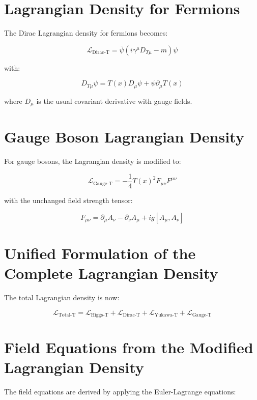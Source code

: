 \documentclass{article}
\begin{document}
	\section{Lagrangian Density for Fermions}
	The Dirac Lagrangian density for fermions becomes:
	
	\begin{equation}
		\mathcal{L}_{\text{Dirac-T}} = \bar{\psi} (i \gamma^\mu D_{T\mu} - m) \psi
	\end{equation}
	
	with:
	
	\begin{equation}
		D_{T\mu} \psi = T(x) D_\mu \psi + \psi \partial_\mu T(x)
	\end{equation}
	
	where \( D_\mu \) is the usual covariant derivative with gauge fields.
	
	\section{Gauge Boson Lagrangian Density}
	For gauge bosons, the Lagrangian density is modified to:
	
	\begin{equation}
		\mathcal{L}_{\text{Gauge-T}} = -\frac{1}{4} T(x)^2 F_{\mu\nu} F^{\mu\nu}
	\end{equation}
	
	with the unchanged field strength tensor:
	
	\begin{equation}
		F_{\mu\nu} = \partial_\mu A_\nu - \partial_\nu A_\mu + i g [A_\mu, A_\nu]
	\end{equation}
	
	\section{Unified Formulation of the Complete Lagrangian Density}
	The total Lagrangian density is now:
	
	\begin{equation}
		\mathcal{L}_{\text{Total-T}} = \mathcal{L}_{\text{Higgs-T}} + \mathcal{L}_{\text{Dirac-T}} + \mathcal{L}_{\text{Yukawa-T}} + \mathcal{L}_{\text{Gauge-T}}
	\end{equation}
	
	\section{Field Equations from the Modified Lagrangian Density}
	The field equations are derived by applying the Euler-Lagrange equations:
	
\end{document}
